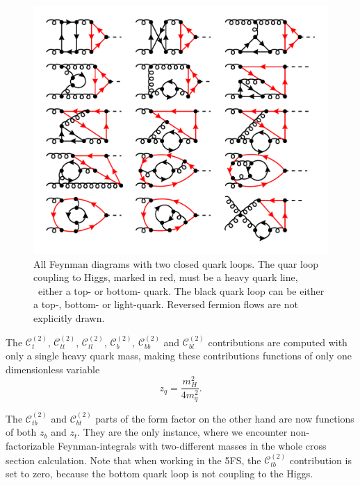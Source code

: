 \begin{figure}[h]
\centering
\includegraphics[width=\figurewidth]{Images/NNLO_Feynman_diagrams/C_tt.pdf}
\caption{All Feynman diagrams with two closed quark loops. The quar loop coupling to Higgs, marked in red, must be a heavy quark line, \ie\ either a top- or bottom- quark. The black quark loop can be either a top-, bottom- or light-quark. Reversed fermion flows are not explicitly drawn.}
\label{fig:5:C_tt}
\end{figure}
The $\mathcal{C}_t^{(2)}$, $\mathcal{C}_{tt}^{(2)}$, $\mathcal{C}_{tl}^{(2)}$, $\mathcal{C}_b^{(2)}$, $\mathcal{C}_{bb}^{(2)}$ and $\mathcal{C}_{bl}^{(2)}$ contributions are computed with only a single heavy quark mass, making these contributions functions of only one dimensionless variable
\begin{equation}
z_q = \frac{m_H^2}{4 m_q^2}.
\end{equation}

The $\mathcal{C}_{tb}^{(2)}$ and $\mathcal{C}_{bt}^{(2)}$ parts of the form factor on the other hand are now functions of both $z_b$ and $z_t$. They are the only instance, where we encounter non-factorizable Feynman-integrals with two-different masses in the whole cross section calculation. Note that when working in the 5\acs{FS}, the $\mathcal{C}_{tb}^{(2)}$ contribution is set to zero, because the bottom quark loop is not coupling to the Higgs.

